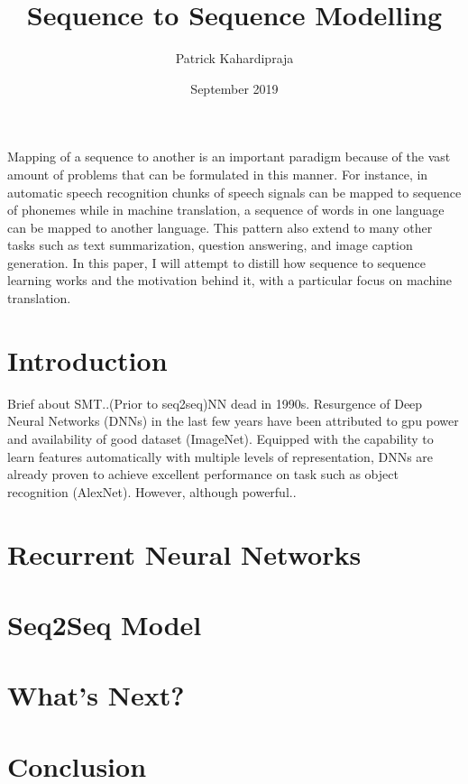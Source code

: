 \documentclass[12pt]{extarticle}
\title{Sequence to Sequence Modelling}
\author{Patrick Kahardipraja}
\date{September 2019}
\begin{document}

\maketitle

Mapping of a sequence to another is an important paradigm because of the vast amount of problems that can be formulated in this manner. For instance, in automatic speech recognition chunks of speech signals can be mapped to sequence of phonemes while in machine translation, a sequence of words in one language can be mapped to another language. This pattern also extend to many other tasks such as text summarization, question answering, and image caption generation. In this paper, I will attempt to distill how sequence to sequence learning works and the motivation behind it, with a particular focus on machine translation.


\section*{Introduction}
Brief about SMT..(Prior to seq2seq)NN dead in 1990s. Resurgence of Deep Neural Networks (DNNs) in the last few years have been attributed to gpu power and availability of good dataset (ImageNet). Equipped with the capability to learn features automatically with multiple levels of representation, DNNs are already proven to achieve excellent performance on task such as object recognition (AlexNet). However, although powerful.. 

\section*{Recurrent Neural Networks}

\section*{Seq2Seq Model}

\section*{What's Next?}

\section*{Conclusion}
\end{document}
